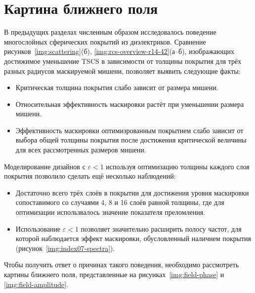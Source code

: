 \section{Картина ближнего поля}\label{sec:near-field}

В предыдущих разделах численным образом исследовалось поведение
многослойных сферических покрытий из диэлектриков. Сравнение
рисунков~\ref{img:scattering}(б), \ref{img:rcs-overview-r14-42}(а--б),
изображающих достижимое уменьшение TSCS в зависимости от толщины
покрытия для трёх разных радиусов маскируемой мишени, позволяет
выявить следующие факты:
\begin{itemize}
\item Критическая толщина покрытия слабо зависит от размера мишени.
\item Относительная эффективность маскировки растёт при уменьшении
  размера мишени.
\item Эффективность маскировки оптимизрованным покрытием слабо зависит
  от выбора общей толщины покрытия после достижения критической
  величины для всех рассмотренных размеров мишени.
\end{itemize}
Моделирование дизайнов с ${\varepsilon<1}$ используя оптимизацию
толщины каждого слоя покрытия позволило сделать ещё несколько
наблюдений:
\begin{itemize}
\item Достаточно всего трёх слоёв в покрытии для достижения уровня
  маскировки сопоставимого со случаями 4, 8 и 16 слоёв равной толщины,
  где для оптимизации использвалось значение показателя преломления.
\item Использование ${\varepsilon<1}$ позволяет значительно расширить
  полосу частот, для которой наблюдается эффект маскировки,
  обусловленный наличием покрытия (рисунок~\ref{img:index07-spectra}).
\end{itemize}
Чтобы получить ответ о причинах такого поведения, необходимо
рассмотреть картины ближнего поля, представленные на
рисунках~\ref{img:field-phase} и \ref{img:field-amplitude}.

